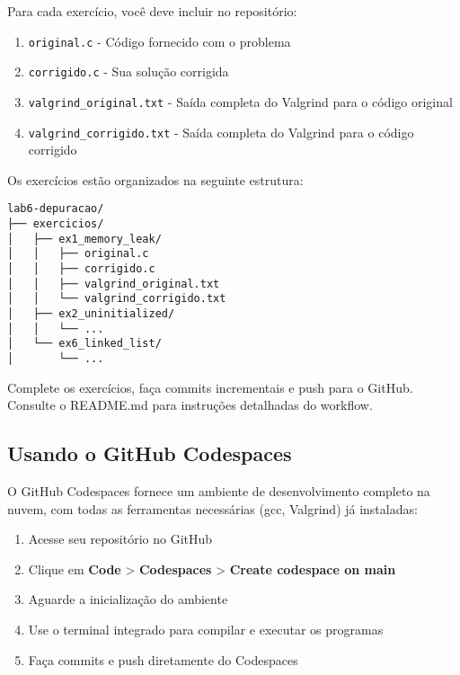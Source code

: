 \documentclass[11pt,a4paper]{article}
\begin{document}
Para cada exercício, você deve incluir no repositório:
\begin{enumerate}
    \item \texttt{original.c} - Código fornecido com o problema
    \item \texttt{corrigido.c} - Sua solução corrigida
    \item \texttt{valgrind\_original.txt} - Saída completa do Valgrind para o código original
    \item \texttt{valgrind\_corrigido.txt} - Saída completa do Valgrind para o código corrigido
\end{enumerate}

\begin{tcolorbox}[colback=lightblue!20, colframe=mackblue, title=\emoji{light-bulb} Estrutura do Repositório]
Os exercícios estão organizados na seguinte estrutura:
\begin{verbatim}
lab6-depuracao/
├── exercicios/
│   ├── ex1_memory_leak/
│   │   ├── original.c
│   │   ├── corrigido.c
│   │   ├── valgrind_original.txt
│   │   └── valgrind_corrigido.txt
│   ├── ex2_uninitialized/
│   │   └── ...
│   └── ex6_linked_list/
│       └── ...
\end{verbatim}

Complete os exercícios, faça commits incrementais e push para o GitHub.
Consulte o README.md para instruções detalhadas do workflow.
\end{tcolorbox}

\subsection{Usando o GitHub Codespaces}

O GitHub Codespaces fornece um ambiente de desenvolvimento completo na nuvem, com todas as ferramentas necessárias (gcc, Valgrind) já instaladas:

\begin{enumerate}
    \item Acesse seu repositório no GitHub
    \item Clique em \textbf{Code} > \textbf{Codespaces} > \textbf{Create codespace on main}
    \item Aguarde a inicialização do ambiente
    \item Use o terminal integrado para compilar e executar os programas
    \item Faça commits e push diretamente do Codespaces
\end{enumerate}
\end{document}
